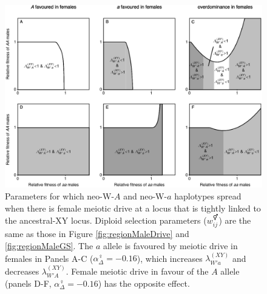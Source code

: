 \documentclass[12pt]{article}
\begin{document}
\begin{figure}[!h]
\centering
\centerline{\includegraphics[width=\linewidth]{Region_Plot_combined_FemaleDrive.eps}}
\caption{
Parameters for which neo-W-$A$ and neo-W-$a$ haplotypes spread when there is female meiotic drive at a locus that is tightly linked to the ancestral-XY locus.
Diploid selection parameters ($w_{ij}^\Hermaphrodite$) are the same as those in Figure \ref{fig:regionMaleDrive} and \ref{fig:regionMaleGS}. 
The $a$ allele is favoured by meiotic drive in females in Panels A-C ($\alpha_{\Delta}^\female=-0.16$), which increases $\lambda_{W'a}^{(XY)}$ and decreases $\lambda_{W'A}^{(XY)}$. 
Female meiotic drive in favour of the $A$ allele (panels D-F, $\alpha_{\Delta}^\female=-0.16$) has the opposite effect. 
}
\label{fig:regionFemaleDrive}
\end{figure}
\end{document}

